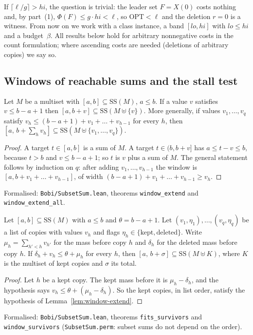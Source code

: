 If $\lceil\ell/g\rceil>hi$, the question is trivial: the leader set $F=X(0)$
costs nothing and, by part~(1), $\Phi(F)\le g\cdot hi<\ell$, so
$\mathrm{OPT}<\ell$ and the deletion $r=0$ is a witness. From now on we work with a class instance, a band
$[lo,hi]$ with $lo\le hi$ and a budget~$\beta$. All results below hold for
arbitrary nonnegative costs in the count formulation; where ascending costs
are needed (deletions of arbitrary copies) we say so.

\subsection{Windows of reachable sums and the stall test}

\begin{lemma}\label{lem:window-extend}
Let $M$ be a multiset with $[a,b]\subseteq\mathrm{SS}(M)$, $a\le b$. If a value $v$
satisfies $v\le b-a+1$ then $[a,b+v]\subseteq\mathrm{SS}(M\uplus\{v\})$. More
generally, if values $v_1,\dots,v_q$ satisfy
$v_h\le (b-a+1)+v_1+\dots+v_{h-1}$ for every $h$, then
$[a,\,b+\sum_h v_h]\subseteq\mathrm{SS}(M\uplus\{v_1,\dots,v_q\})$.
\end{lemma}
\begin{proof}
A target $t\in[a,b]$ is a sum of $M$. A target $t\in(b,b+v]$ has
$a\le t-v\le b$, because $t>b$ and $v\le b-a+1$; so $t$ is $v$ plus a sum of
$M$. The
general statement follows by induction on $q$: after adding $v_1,\dots,v_{h-1}$
the window is $[a,b+v_1+\dots+v_{h-1}]$, of width
$(b-a+1)+v_1+\dots+v_{h-1}\ge v_h$.
\end{proof}
{\raggedright\noindent Formalised: \texttt{Bobi/SubsetSum.lean}, theorems
\texttt{window\_extend} and \texttt{window\_extend\_all}.\par}

\begin{lemma}\label{lem:window-survivors}
Let $[a,b]\subseteq\mathrm{SS}(M)$ with $a\le b$ and $\theta=b-a+1$. Let
$(v_1,\eta_1),\dots,(v_q,\eta_q)$ be a list of copies with values $v_h$ and
flags $\eta_h\in\{\text{kept},\text{deleted}\}$. Write $\mu_h=\sum_{h'<h}v_{h'}$
for the mass before copy $h$ and $\delta_h$ for the deleted mass before copy
$h$. If $\delta_h+v_h\le\theta+\mu_h$ for every $h$, then
$[a,\,b+\sigma]\subseteq\mathrm{SS}(M\uplus K)$, where $K$ is the multiset of kept
copies and $\sigma$ its total.
\end{lemma}
\begin{proof}
Let $h$ be a kept copy. The kept mass before it is $\mu_h-\delta_h$, and the
hypothesis says $v_h\le\theta+(\mu_h-\delta_h)$. So the kept copies, in list
order, satisfy the hypothesis of Lemma~\ref{lem:window-extend}.
\end{proof}
{\raggedright\noindent Formalised: \texttt{Bobi/SubsetSum.lean}, theorems
\texttt{fits\_survivors} and \texttt{window\_survivors}
(\texttt{SubsetSum.perm}: subset sums do not depend on the order).\par}

